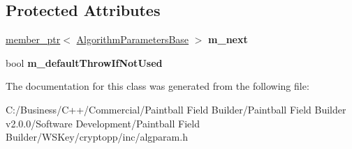 \subsection*{Protected Attributes}
\begin{DoxyCompactItemize}
\item 
\hypertarget{class_algorithm_parameters_a4f1ccbb1ce9e90a52f47590a9c73da79}{
\hyperlink{classmember__ptr}{member\_\-ptr}$<$ \hyperlink{class_algorithm_parameters_base}{AlgorithmParametersBase} $>$ {\bfseries m\_\-next}}
\label{class_algorithm_parameters_a4f1ccbb1ce9e90a52f47590a9c73da79}

\item 
\hypertarget{class_algorithm_parameters_acf5b589ac74ffc34a324bf7bdfe8fe1e}{
bool {\bfseries m\_\-defaultThrowIfNotUsed}}
\label{class_algorithm_parameters_acf5b589ac74ffc34a324bf7bdfe8fe1e}

\end{DoxyCompactItemize}


The documentation for this class was generated from the following file:\begin{DoxyCompactItemize}
\item 
C:/Business/C++/Commercial/Paintball Field Builder/Paintball Field Builder v2.0.0/Software Development/Paintball Field Builder/WSKey/cryptopp/inc/algparam.h\end{DoxyCompactItemize}
